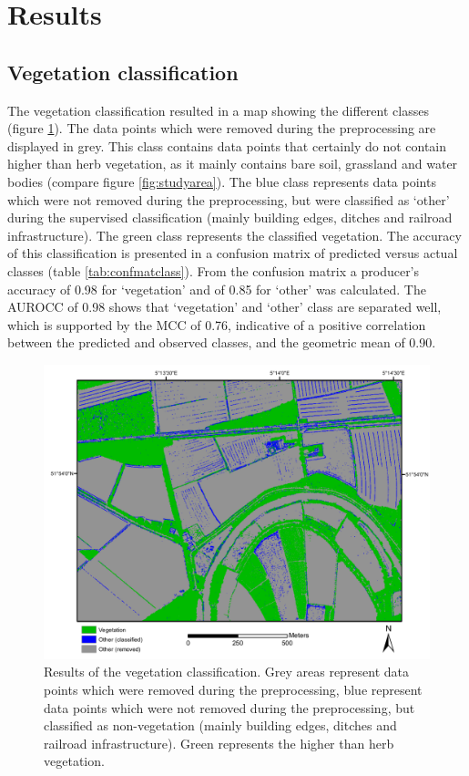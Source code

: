 \section{Results}
\subsection{Vegetation classification}
The vegetation classification resulted in a map showing the different classes (figure \ref{fig:classification}). The data points which were removed during the preprocessing are displayed in grey. This class contains data points that certainly do not contain higher than herb vegetation, as it mainly contains bare soil, grassland and water bodies (compare figure \ref{fig:studyarea}). The blue class represents data points which were not removed during the preprocessing, but were classified as `other' during the supervised classification (mainly building edges, ditches and railroad infrastructure). The green class represents the classified vegetation. The accuracy of this classification is presented in a confusion matrix of predicted versus actual classes (table \ref{tab:confmatclass}). From the confusion matrix a producer’s accuracy of 0.98 for `vegetation' and of 0.85 for `other' was calculated. The AUROCC of 0.98 shows that `vegetation' and `other' class are separated well, which is supported by the MCC of 0.76, indicative of a positive correlation between the predicted and observed classes, and the geometric mean of 0.90.

\begin{figure}
	\centering
	\includegraphics[width=\columnwidth]{./img/classification.pdf}
	\caption{Results of the vegetation classification. Grey areas represent data points which were removed during the preprocessing, blue represent data points which were not removed during the preprocessing, but classified as non-vegetation (mainly building edges, ditches and railroad infrastructure). Green represents the higher than herb vegetation.}
	\label{fig:classification}
\end{figure}

